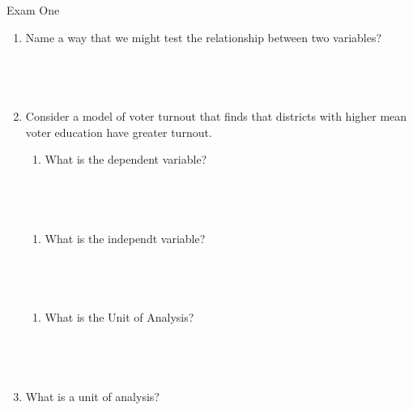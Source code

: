 \documentclass{article}
\begin{document}
\begin{center}
{\Huge Exam One}

\end{center}
\thispagestyle{plain}

\begin{enumerate}
\def\labelenumi{\arabic{enumi}.}
\item
  Name a way that we might test the relationship between two variables?

\begin{verbatim}




\end{verbatim}
\item
  Consider a model of voter turnout that finds that districts with
  higher mean voter education have greater turnout.

  \begin{enumerate}
  \def\labelenumii{\alph{enumii}.}
  \itemsep1pt\parskip0pt
  \item
    What is the dependent variable?
  \end{enumerate}

\begin{verbatim}




\end{verbatim}

  \begin{enumerate}
  \def\labelenumii{\alph{enumii}.}
  \setcounter{enumii}{1}
  \itemsep1pt\parskip0pt
  \item
    What is the independt variable?
  \end{enumerate}

\begin{verbatim}




\end{verbatim}

  \begin{enumerate}
  \def\labelenumii{\alph{enumii}.}
  \setcounter{enumii}{2}
  \itemsep1pt\parskip0pt
  \item
    What is the Unit of Analysis?
  \end{enumerate}

\begin{verbatim}




\end{verbatim}
\item
  What is a unit of analysis?


\end{enumerate}
\end{document}
